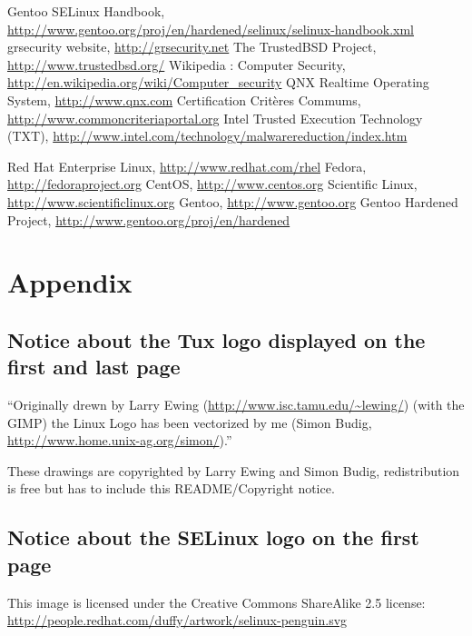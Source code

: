 \documentclass[pdftex,a4paper,titlepage,11pt]{article}
\newcommand{\lastPage}{
	\newpage
	\strut
	\fancyhf{}
	\renewcommand{\headrulewidth}{0pt}
	\addtocounter{page}{-1}
	\AddToShipoutPicture*{\BackgroundPic{Tux_n&b_half_1.png}}
	\newpage
}
\newcommand\BackgroundPic[1]{
	\put(0,-100){
		\parbox[b][\paperheight]{\paperwidth}{
			\vfill
			\centering
			\texttt{[image: \#1]}
			\vfill
		}
	}
}
\begin{document}
\begin{thebibliography}{40}
 Gentoo SELinux Handbook,  \url{http://www.gentoo.org/proj/en/hardened/selinux/selinux-handbook.xml}
 grsecurity website, \url{http://grsecurity.net}
 The TrustedBSD Project, \url{http://www.trustedbsd.org/}
 Wikipedia : Computer Security, \url{http://en.wikipedia.org/wiki/Computer_security}
 QNX Realtime Operating System, \url{http://www.qnx.com}
 Certification Critères Commums, \url{http://www.commoncriteriaportal.org}
 Intel Trusted Execution Technology (TXT), \url{http://www.intel.com/technology/malwarereduction/index.htm}

 Red Hat Enterprise Linux, \url{http://www.redhat.com/rhel}
 Fedora, \url{http://fedoraproject.org}
 CentOS, \url{http://www.centos.org}
 Scientific Linux, \url{http://www.scientificlinux.org}
 Gentoo, \url{http://www.gentoo.org}
 Gentoo Hardened Project, \url{http://www.gentoo.org/proj/en/hardened}

\end{thebibliography}

\newpage





\printnomenclature[3cm]

\newpage

\section*{Appendix} 

\subsection*{Notice about the Tux logo displayed on the first and last page}
``Originally drewn by Larry Ewing (\url{http://www.isc.tamu.edu/~lewing/}) (with the GIMP) the Linux Logo has been vectorized by me (Simon Budig, \url{http://www.home.unix-ag.org/simon/}).''

\bigskip

These drawings are copyrighted by Larry Ewing and Simon Budig, redistribution is free but has to include this README/Copyright notice.

\subsection*{Notice about the SELinux logo on the first page}
This image is licensed under the Creative Commons ShareAlike 2.5 license: \url{http://people.redhat.com/duffy/artwork/selinux-penguin.svg}

\lastPage
\end{document}
